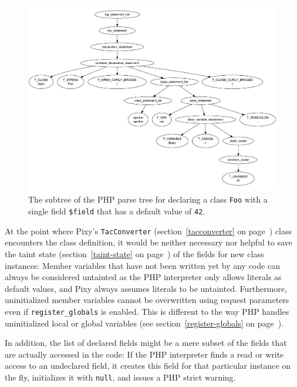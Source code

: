 \begin{figure}[htb]
  \begin{center}
    \includegraphics[width=\linewidth, height=.9\textheight, keepaspectratio]{images/parsetree-foo-class-declaration}
    \caption{The subtree of the PHP parse tree for declaring a class \texttt{Foo} with a single field \texttt{\$field} that has a default value of \texttt{42}.}
    \label{fig:parse-tree-foo-class}
  \end{center}
\end{figure}

At the point where Pixy's \texttt{TacConverter} (section~\ref{tacconverter} on page~\pageref{tacconverter}) class encounters the class definition, it would be neither necessary nor helpful to save the taint state (section~\ref{taint-state} on page~\pageref{taint-state})\label{fields-not-saved-on-new} of the fields for new class instances: Member variables that have not been written yet by any code can always be considered untainted as the PHP interpreter only allows literals as default values, and Pixy always assumes literals to be untainted. Furthermore, uninitialized member variables cannot be overwritten using request parameters even if \texttt{register\_globals} is enabled. This is different to the way PHP handles uninitialized local or global variables (see section~\ref{register-globals} on page~\pageref{register-globals}).

In addition, the list of declared fields might be a mere subset of the fields that are actually accessed in the code: If the PHP interpreter finds a read or write access to an undeclared field, it creates this field for that particular instance on the fly, initializes it with \texttt{null}, and issues a PHP strict warning.



